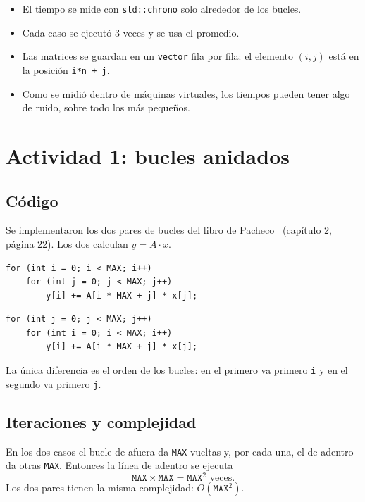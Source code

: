 \documentclass[11pt]{article}
\begin{document}
\begin{itemize}
\item El tiempo se mide con \texttt{std::chrono} solo alrededor de los bucles.
\item Cada caso se ejecutó 3 veces y se usa el promedio.
\item Las matrices se guardan en un \texttt{vector} fila por fila: el elemento
      $(i,j)$ está en la posición \texttt{i*n + j}.
\item Como se midió dentro de máquinas virtuales, los tiempos pueden tener
      algo de ruido, sobre todo los más pequeños.
\end{itemize}

\section{Actividad 1: bucles anidados}

\subsection{Código}

Se implementaron los dos pares de bucles del libro de Pacheco~\cite{pacheco}
(capítulo 2, página 22). Los dos calculan $y = A \cdot x$.

\begin{lstlisting}[caption={Primer par: recorre la matriz por filas.}]
for (int i = 0; i < MAX; i++)
    for (int j = 0; j < MAX; j++)
        y[i] += A[i * MAX + j] * x[j];
\end{lstlisting}

\begin{lstlisting}[caption={Segundo par: recorre la matriz por columnas.}]
for (int j = 0; j < MAX; j++)
    for (int i = 0; i < MAX; i++)
        y[i] += A[i * MAX + j] * x[j];
\end{lstlisting}

La única diferencia es el orden de los bucles: en el primero va primero
\texttt{i} y en el segundo va primero \texttt{j}.

\subsection{Iteraciones y complejidad}

En los dos casos el bucle de afuera da \texttt{MAX} vueltas y, por cada una,
el de adentro da otras \texttt{MAX}. Entonces la línea de adentro se ejecuta
\[
\texttt{MAX} \times \texttt{MAX} = \texttt{MAX}^2 \text{ veces.}
\]
Los dos pares tienen la misma complejidad: $O(\texttt{MAX}^2)$.
\end{document}
